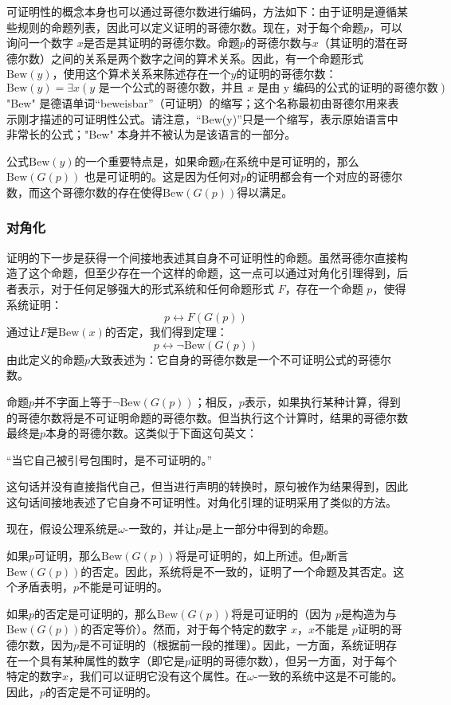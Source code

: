 可证明性的概念本身也可以通过哥德尔数进行编码，方法如下：由于证明是遵循某些规则的命题列表，因此可以定义证明的哥德尔数。现在，对于每个命题\( p \)，可以询问一个数字 \( x \)是否是其证明的哥德尔数。命题\( p \)的哥德尔数与\( x \)（其证明的潜在哥德尔数）之间的关系是两个数字之间的算术关系。因此，有一个命题形式\( \text{Bew}(y) \)，使用这个算术关系来陈述存在一个\( y \)的证明的哥德尔数：
\[
\text{Bew}(y) = \exists x \left( y \text{ 是一个公式的哥德尔数，并且 } x \text{ 是由 y 编码的公式的证明的哥德尔数} \right)~
\]
"Bew" 是德语单词“beweisbar”（可证明）的缩写；这个名称最初由哥德尔用来表示刚才描述的可证明性公式。请注意，“Bew(y)”只是一个缩写，表示原始语言中非常长的公式；"Bew" 本身并不被认为是该语言的一部分。

公式\( \text{Bew}(y) \)的一个重要特点是，如果命题\( p \)在系统中是可证明的，那么 \( \text{Bew}(G(p)) \) 也是可证明的。这是因为任何对\( p \)的证明都会有一个对应的哥德尔数，而这个哥德尔数的存在使得\( \text{Bew}(G(p)) \)得以满足。
\subsubsection{对角化} 
证明的下一步是获得一个间接地表述其自身不可证明性的命题。虽然哥德尔直接构造了这个命题，但至少存在一个这样的命题，这一点可以通过对角化引理得到，后者表示，对于任何足够强大的形式系统和任何命题形式 \( F \)，存在一个命题 \( p \)，使得系统证明：
\[
p \leftrightarrow F(G(p))~
\]
通过让\( F \)是\( \text{Bew}(x) \)的否定，我们得到定理：
\[
p \leftrightarrow \neg \text{Bew}(G(p))~
\]
由此定义的命题\( p \)大致表述为：它自身的哥德尔数是一个不可证明公式的哥德尔数。

命题\( p \)并不字面上等于\( \neg \text{Bew}(G(p)) \)；相反，\( p \)表示，如果执行某种计算，得到的哥德尔数将是不可证明命题的哥德尔数。但当执行这个计算时，结果的哥德尔数最终是\( p \)本身的哥德尔数。这类似于下面这句英文：

“当它自己被引号包围时，是不可证明的。”

这句话并没有直接指代自己，但当进行声明的转换时，原句被作为结果得到，因此这句话间接地表述了它自身不可证明性。对角化引理的证明采用了类似的方法。

现在，假设公理系统是\( \omega \)-一致的，并让\( p \)是上一部分中得到的命题。

如果\( p \)可证明，那么\( \text{Bew}(G(p)) \)将是可证明的，如上所述。但\( p \)断言\( \text{Bew}(G(p)) \)的否定。因此，系统将是不一致的，证明了一个命题及其否定。这个矛盾表明，\( p \)不能是可证明的。

如果\( p \)的否定是可证明的，那么\( \text{Bew}(G(p)) \)将是可证明的（因为 \( p \)是构造为与\( \text{Bew}(G(p)) \)的否定等价）。然而，对于每个特定的数字 \( x \)，\( x \)不能是 \( p \)证明的哥德尔数，因为\( p \)是不可证明的（根据前一段的推理）。因此，一方面，系统证明存在一个具有某种属性的数字（即它是\( p \)证明的哥德尔数），但另一方面，对于每个特定的数字\( x \)，我们可以证明它没有这个属性。在\( \omega \)-一致的系统中这是不可能的。因此，\( p \)的否定是不可证明的。

